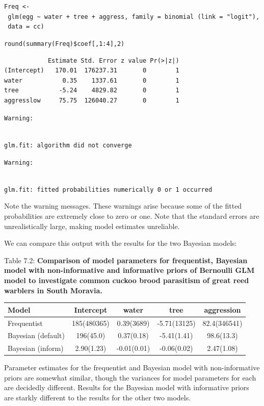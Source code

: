 \documentclass[
]{book}
\begin{document}
\texttt{Freq\ \textless{}-\ glm(egg\ \textasciitilde{}\ water\ +\ tree\ +\ aggress,\ family\ =\ binomial\ (link\ =\ "logit"),\ data\ =\ cc)}

\texttt{round(summary(Freq)\$coef{[},1:4{]},2)}

\begin{verbatim}
            Estimate Std. Error z value Pr(>|z|)
(Intercept)   170.01  176237.31       0        1
water           0.35    1337.61       0        1
tree           -5.24    4829.82       0        1
aggresslow     75.75  126040.27       0        1
\end{verbatim}

\texttt{Warning:}\strut \\
\texttt{glm.fit:\ algorithm\ did\ not\ converge}

\texttt{Warning:}\strut \\
\texttt{glm.fit:\ fitted\ probabilities\ numerically\ 0\ or\ 1\ occurred}

Note the warning messages. These warnings arise because some of the fitted probabilities are extremely close to zero or one. Note that the standard errors are unrealistically large, making model estimates unreliable.

We can compare this output with the results for the two Bayesian models:

Table 7.2: \textbf{Comparison of model parameters for frequentist, Bayesian model with non-informative and informative priors of Bernoulli GLM model to investigate common cuckoo brood parasitism of great reed warblers in South Moravia.}

\begin{longtable}[]{@{}lcccc@{}}
\toprule
Model & Intercept & water & tree & aggression \\
\midrule
\endhead
Frequentist & 185(480365) & 0.39(3689) & -5.71(13125) & 82.4(346541) \\
Bayesian (default) & 196(45.0) & 0.37(0.18) & -5.41(1.41) & 98.6(13.3) \\
Bayesian (inform) & 2.90(1.23) & -0.01(0.01) & -0.06(0.02) & 2.47(1.08) \\
\bottomrule
\end{longtable}

Parameter estimates for the frequentist and Bayesian model with non-informative priors are somewhat similar, though the variances for model parameters for each are decidedly different. Results for the Bayesian model with informative priors are starkly different to the results for the other two models.
\end{document}
